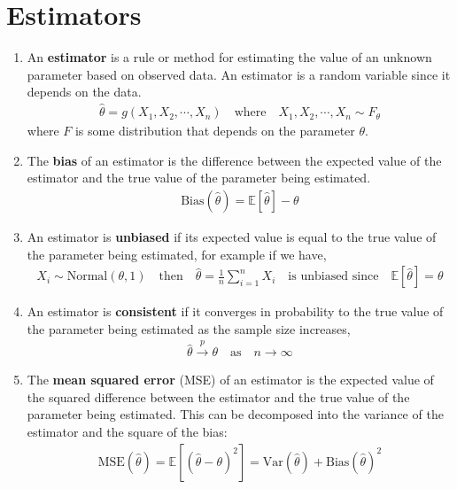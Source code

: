 \documentclass[letterpaper, 11pt]{article}
\newcommand{\converge}[1][]{\xrightarrow{#1}}
\newcommand{\E}{\mathbb{E}}	%
\newcommand{\1}{\mathds{1}}	%
\theoremstyle{definition}
\begin{document}
\section{Estimators}
\begin{enumerate}
    \item An \textbf{estimator} is a rule or method for estimating the value of an unknown parameter based on observed data. An estimator is a random variable since it depends on the data.
    \begin{align}
        \hat{\theta} = g(X_1, X_2, \cdots, X_n) \quad \text{where} \quad X_1, X_2, \cdots, X_n \sim F_{\theta}
    \end{align}
    where $F$ is some distribution that depends on the parameter $\theta$.
    \item The \textbf{bias} of an estimator is the difference between the expected value of the estimator and the true value of the parameter being estimated.
    \begin{align}
        \text{Bias}(\hat{\theta}) = \E[\hat{\theta}] - \theta
    \end{align}
    \item An estimator is \textbf{unbiased} if its expected value is equal to the true value of the parameter being estimated, for 
    example if we have,
    \begin{align}
        X_i \sim \text{Normal}(\theta, 1) \quad \text{then} \quad \hat{\theta} = \frac{1}{n} \sum_{i=1}^{n} X_i \quad \text{is unbiased since} \quad \E[\hat{\theta}] = \theta
    \end{align}
    \item An estimator is \textbf{consistent} if it converges in probability to the true value of the parameter being estimated as the sample size increases,
    \begin{align}
        \hat{\theta} \converge[p] \theta \quad \text{as} \quad n \to \infty
    \end{align}
    \item The \textbf{mean squared error} (MSE) of an estimator is the expected value of the squared difference between the estimator and the true value of the parameter being estimated.
    This can be decomposed into the variance of the estimator and the square of the bias:
    \begin{align}
        \text{MSE}(\hat{\theta}) = \E[(\hat{\theta} - \theta)^2] = \text{Var}(\hat{\theta}) + \text{Bias}(\hat{\theta})^2
    \end{align}
    \begin{itemize}

\end{itemize}
\end{enumerate}
\end{document}
